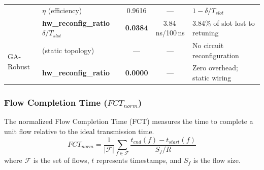 \documentclass{article}
\begin{document}
\begin{table}[H]
\begin{tabular}{|l|l|c|c|l|}
                & $\eta$ (efficiency)                & 0.9616 & ---               & $1 - \delta/T_{slot}$ \\
                & \textbf{hw\_reconfig\_ratio} $\delta/T_{slot}$ & \textbf{0.0384} & 3.84\,ns/100\,ns & 3.84\% of slot lost to retuning \\
            \hline
            \multirow{2}{*}{GA-Robust}
                & (static topology)      & ---                & ---               & No circuit reconfiguration \\
                & \textbf{hw\_reconfig\_ratio} & \textbf{0.0000} & ---             & Zero overhead; static wiring \\
            \hline
        \end{tabular}
        \label{tab:reff_constants}
    \end{table}

    \subsubsection{Flow Completion Time ($FCT_{norm}$)}
    The normalized Flow Completion Time (FCT) measures the time to complete a unit flow relative to the ideal transmission time.
    \begin{equation}
        FCT_{norm} = \frac{1}{|\mathcal{F}|} \sum_{f \in \mathcal{F}} \frac{t_{end}(f) - t_{start}(f)}{S_f / R}
    \end{equation}
    where $\mathcal{F}$ is the set of flows, $t$ represents timestamps, and $S_f$ is the flow size.
\end{document}

